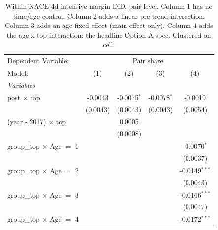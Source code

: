 
\begin{table}[htbp]
   \caption{\label{tab:phase4_within_intensive_did_agecontrol} Within-NACE-4d intensive margin DiD, pair-level. Column 1 has no time/age control. Column 2 adds a linear pre-trend interaction. Column 3 adds an age fixed effect (main effect only). Column 4 adds the age x top interaction: the headline Option A spec. Clustered on cell.}
   \centering
   \begin{tabular}{lcccc}
      \tabularnewline \midrule \midrule
      Dependent Variable: & \multicolumn{4}{c}{Pair share}\\
      Model:                           & (1)                   & (2)                   & (3)                   & (4)\\  
      \midrule
      \emph{Variables}\\
      post $\times$ top                & -0.0043               & -0.0075$^{*}$         & -0.0078$^{*}$         & -0.0019\\   
                                       & (0.0043)              & (0.0043)              & (0.0043)              & (0.0054)\\   
      (year - 2017) $\times$ top       &                       & 0.0005                &                       &   \\   
                                       &                       & (0.0008)              &                       &   \\   
      group\_top $\times$ Age $=$ 1    &                       &                       &                       & -0.0070$^{*}$\\   
                                       &                       &                       &                       & (0.0037)\\   
      group\_top $\times$ Age $=$ 2    &                       &                       &                       & -0.0149$^{***}$\\   
                                       &                       &                       &                       & (0.0043)\\   
      group\_top $\times$ Age $=$ 3    &                       &                       &                       & -0.0166$^{***}$\\   
                                       &                       &                       &                       & (0.0047)\\   
      group\_top $\times$ Age $=$ 4    &                       &                       &                       & -0.0172$^{***}$\\   

\end{tabular}
\end{table}
